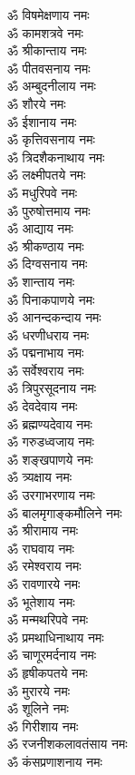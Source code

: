 \begin{multicols}{2}
\begin{flushleft}
ॐ विषमेक्षणाय नमः\hfill{}\\
ॐ कामशत्रवे नमः\\
ॐ श्रीकान्ताय नमः\\
ॐ पीतवसनाय नमः\\
ॐ अम्बुदनीलाय नमः\\
ॐ शौरये नमः\\
ॐ ईशानाय नमः\\
ॐ कृत्तिवसनाय नमः\\
ॐ त्रिदशैकनाथाय नमः\\
ॐ लक्ष्मीपतये नमः\\
ॐ मधुरिपवे नमः\hfill{}\\
ॐ पुरुषोत्तमाय नमः\\
ॐ आद्याय नमः\\
ॐ श्रीकण्ठाय नमः\\
ॐ दिग्वसनाय नमः\\
ॐ शान्ताय नमः\\
ॐ पिनाकपाणये नमः\\
ॐ आनन्दकन्दाय नमः\\
ॐ धरणीधराय नमः\\
ॐ पद्मनाभाय नमः\\
ॐ सर्वेश्वराय नमः\hfill{}\\
ॐ त्रिपुरसूदनाय नमः\\
ॐ देवदेवाय नमः\\
ॐ ब्रह्मण्यदेवाय नमः\\
ॐ गरुडध्वजाय नमः\\
ॐ शङ्खपाणये नमः\\
ॐ त्र्यक्षाय नमः\\
ॐ उरगाभरणाय नमः\\
ॐ बालमृगाङ्कमौलिने नमः\\
ॐ श्रीरामाय नमः\\
ॐ राघवाय नमः\hfill{}\\
ॐ रमेश्वराय नमः\\
ॐ रावणारये नमः\\
ॐ भूतेशाय नमः\\
ॐ मन्मथरिपवे नमः\\
ॐ प्रमथाधिनाथाय नमः\\
ॐ चाणूरमर्दनाय नमः\\
ॐ हृषीकपतये नमः\\
ॐ मुरारये नमः\\
ॐ शूलिने नमः\\
ॐ गिरीशाय नमः\hfill{}\\
ॐ रजनीशकलावतंसाय नमः\\
ॐ कंसप्रणाशनाय नमः\\

\end{flushleft}
\end{multicols}
